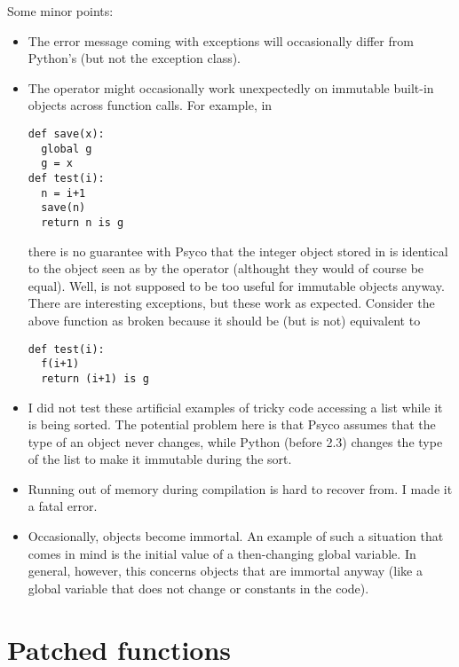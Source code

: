 \documentclass{manual}
\begin{document}
Some minor points:
%
\begin{itemize}
  
\item The error message coming with exceptions will occasionally differ from Python's (but not the exception class).
  
\item The  operator might occasionally work unexpectedly on immutable built-in objects across function calls.  For example, in
\begin{verbatim}
def save(x):
  global g
  g = x
def test(i):
  n = i+1
  save(n)
  return n is g
\end{verbatim}
  there is no guarantee with Psyco that the integer object stored in  is identical to the object seen as  by the operator  (althought they would of course be equal).  Well,  is not supposed to be too useful for immutable objects anyway.  There are interesting exceptions, but these work as expected.  Consider the above  function as broken because it should be (but is not) equivalent to
\begin{verbatim}
def test(i):
  f(i+1)
  return (i+1) is g
\end{verbatim}
  
\item I did not test these artificial examples of tricky code accessing a list while it is being sorted.  The potential problem here is that Psyco assumes that the type of an object never changes, while Python (before 2.3) changes the type of the list to make it immutable during the sort.
  
\item Running out of memory during compilation is hard to recover from.  I made it a fatal error.
  
\item Occasionally, objects become immortal.  An example of such a situation that comes in mind is the initial value of a then-changing global variable.  In general, however, this concerns objects that are immortal anyway (like a global variable that does not change or constants in the code).
  
\end{itemize}


\section{Patched functions}\label{patchedfunctions}
\end{document}
